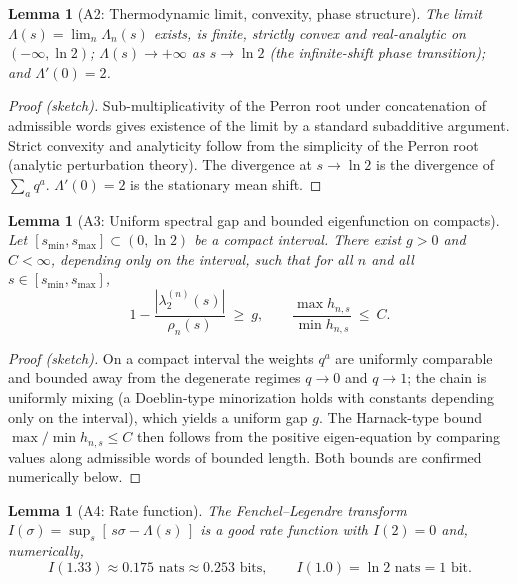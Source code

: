 \documentclass[12pt,a4paper]{article}
\newtheorem{lemma}[theorem]{Lemma}
\begin{document}
\begin{lemma}[A2: Thermodynamic limit, convexity, phase structure]
The limit $\Lambda(s)=\lim_n\Lambda_n(s)$ exists, is finite, strictly convex and real-analytic on $(-\infty,\ln2)$; $\Lambda(s)\to+\infty$ as $s\to\ln2$ (the infinite-shift phase transition); and $\Lambda'(0)=2$.
\end{lemma}
\begin{proof}[Proof (sketch)]
Sub-multiplicativity of the Perron root under concatenation of admissible words gives existence of the limit by a standard subadditive argument. Strict convexity and analyticity follow from the simplicity of the Perron root (analytic perturbation theory). The divergence at $s\to\ln2$ is the divergence of $\sum_a q^a$. $\Lambda'(0)=2$ is the stationary mean shift.
\end{proof}

\begin{lemma}[A3: Uniform spectral gap and bounded eigenfunction on compacts]
Let $[s_{\min},s_{\max}]\subset(0,\ln2)$ be a compact interval. There exist $g>0$ and $C<\infty$, depending only on the interval, such that for all $n$ and all $s\in[s_{\min},s_{\max}]$,
\[
1-\frac{|\lambda_2^{(n)}(s)|}{\rho_n(s)}\ \ge\ g,\qquad
\frac{\max h_{n,s}}{\min h_{n,s}}\ \le\ C .
\]
\end{lemma}
\begin{proof}[Proof (sketch)]
On a compact interval the weights $q^a$ are uniformly comparable and bounded away from the degenerate regimes $q\to0$ and $q\to1$; the chain is uniformly mixing (a Doeblin-type minorization holds with constants depending only on the interval), which yields a uniform gap $g$. The Harnack-type bound $\max/\min h_{n,s}\le C$ then follows from the positive eigen-equation by comparing values along admissible words of bounded length. Both bounds are confirmed numerically below.
\end{proof}

\begin{lemma}[A4: Rate function]
The Fenchel--Legendre transform $I(\sigma)=\sup_{s}[\,s\sigma-\Lambda(s)\,]$ is a good rate function with $I(2)=0$ and, numerically,
\[
I(1.33)\approx0.175\text{ nats}\approx0.253\text{ bits},\qquad I(1.0)=\ln 2\text{ nats}=1\text{ bit}.
\]
\end{lemma}
\end{document}
